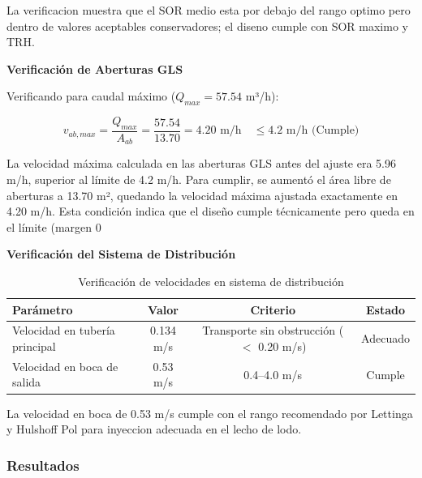 \documentclass[12pt,a4paper]{article}
\begin{document}
La verificacion muestra que el SOR medio esta por debajo del rango optimo pero dentro de valores aceptables conservadores; el diseno cumple con SOR maximo y TRH.

\textbf{Verificación de Aberturas GLS}

Verificando para caudal máximo ($Q_{max} = 57.54$ m³/h):

\begin{equation}
v_{ab,max} = \frac{Q_{max}}{A_{ab}} = \frac{57.54}{13.70} = 4.20 \text{ m/h} \quad \leq 4.2 \text{ m/h } \text{(Cumple)}
\end{equation}

La velocidad máxima calculada en las aberturas GLS antes del ajuste era 5.96 m/h, superior al límite de 4.2 m/h. Para cumplir, se aumentó el área libre de aberturas a 13.70 m², quedando la velocidad máxima ajustada exactamente en 4.20 m/h. Esta condición indica que el diseño cumple técnicamente pero queda en el límite (margen 0 %

\textbf{Verificación del Sistema de Distribución}

\begin{table}[H]
\centering
\caption{Verificación de velocidades en sistema de distribución}
\begin{tabular}{lccc}
\toprule
\textbf{Parámetro} & \textbf{Valor} & \textbf{Criterio} & \textbf{Estado} \\
\midrule
Velocidad en tubería principal& 0.134 m/s & Transporte sin obstrucción ($<$ 0.20 m/s) & Adecuado \\
Velocidad en boca de salida & 0.53 m/s & 0.4--4.0 m/s & Cumple \\
\bottomrule
\end{tabular}
\end{table}

La velocidad en boca de 0.53 m/s cumple con el rango recomendado por Lettinga y Hulshoff Pol para inyeccion adecuada en el lecho de lodo.

\subsubsection{Resultados}
\end{document}
